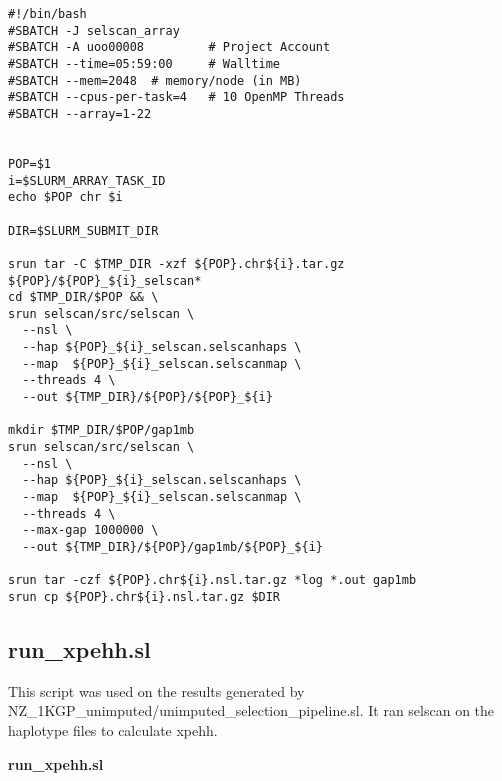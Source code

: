 \documentclass[]{report}
\begin{document}
\begin{verbatim}
#!/bin/bash
#SBATCH -J selscan_array
#SBATCH -A uoo00008         # Project Account
#SBATCH --time=05:59:00     # Walltime
#SBATCH --mem=2048  # memory/node (in MB)
#SBATCH --cpus-per-task=4   # 10 OpenMP Threads
#SBATCH --array=1-22


POP=$1
i=$SLURM_ARRAY_TASK_ID
echo $POP chr $i

DIR=$SLURM_SUBMIT_DIR

srun tar -C $TMP_DIR -xzf ${POP}.chr${i}.tar.gz ${POP}/${POP}_${i}_selscan* 
cd $TMP_DIR/$POP && \
srun selscan/src/selscan \
  --nsl \
  --hap ${POP}_${i}_selscan.selscanhaps \
  --map  ${POP}_${i}_selscan.selscanmap \
  --threads 4 \
  --out ${TMP_DIR}/${POP}/${POP}_${i}
  
mkdir $TMP_DIR/$POP/gap1mb
srun selscan/src/selscan \
  --nsl \
  --hap ${POP}_${i}_selscan.selscanhaps \
  --map  ${POP}_${i}_selscan.selscanmap \
  --threads 4 \
  --max-gap 1000000 \
  --out ${TMP_DIR}/${POP}/gap1mb/${POP}_${i}
  
srun tar -czf ${POP}.chr${i}.nsl.tar.gz *log *.out gap1mb
srun cp ${POP}.chr${i}.nsl.tar.gz $DIR
\end{verbatim}

\subsection{run\_xpehh.sl}\label{run_xpehh.sl}

This script was used on the results generated by
NZ\_1KGP\_unimputed/unimputed\_selection\_pipeline.sl. It ran selscan on
the haplotype files to calculate \gls{xpehh}.

\textbf{run\_xpehh.sl}
\end{document}
